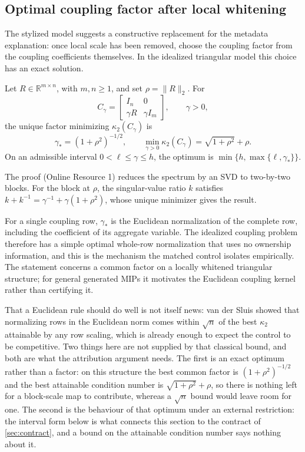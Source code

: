 \subsection{Optimal coupling factor after local whitening}

The stylized model suggests a constructive replacement for the metadata explanation: once
local scale has been removed, choose the coupling factor from the coupling coefficients
themselves. In the idealized triangular model this choice has an exact solution.

\begin{proposition}
\label{prop:audit-triangular-optimum}
Let $R\in\mathbb R^{m\times n}$, with $m,n\geq1$, and set $\rho=\|R\|_2$. For
\[
 C_\gamma=\begin{bmatrix}I_n&0\\\gamma R&\gamma I_m\end{bmatrix},
 \qquad\gamma>0,
\]
the unique factor minimizing $\kappa_2(C_\gamma)$ is
\[
 \gamma_*=(1+\rho^2)^{-1/2},
 \qquad
 \min_{\gamma>0}\kappa_2(C_\gamma)=\sqrt{1+\rho^2}+\rho.
\]
On an admissible interval $0<\ell\leq\gamma\leq h$, the optimum is
$\min\{h,\max\{\ell,\gamma_*\}\}$.
\end{proposition}
The proof (Online Resource 1) reduces the spectrum by an SVD to two-by-two blocks. For the
block at $\rho$, the singular-value ratio $k$ satisfies
$k+k^{-1}=\gamma^{-1}+\gamma(1+\rho^2)$, whose unique minimizer gives the result.

For a single coupling row, $\gamma_*$ is the Euclidean normalization of the complete row,
including the coefficient of its aggregate variable. The idealized coupling problem
therefore has a simple optimal whole-row normalization that uses no ownership information,
and this is the mechanism the matched control isolates empirically. The statement concerns a
common factor on a locally whitened triangular structure; for general generated MIPs it
motivates the Euclidean coupling kernel rather than certifying it.

That a Euclidean rule should do well is not itself news: van der Sluis
\cite{vandersluis1969condition} showed that normalizing rows in the Euclidean norm comes
within $\sqrt n$ of the best $\kappa_2$ attainable by any row scaling, which is already
enough to expect the control to be competitive. Two things here are not supplied by that
classical bound, and both are what the attribution argument needs. The first is an exact
optimum rather than a factor: on this structure the best common factor is $(1+\rho^2)^{-1/2}$
and the best attainable condition number is $\sqrt{1+\rho^2}+\rho$, so there is nothing left
for a block-scale map to contribute, whereas a $\sqrt n$ bound would leave room for one. The
second is the behaviour of that optimum under an external restriction: the interval form
below is what connects this section to the contract of \cref{sec:contract}, and a bound on
the attainable condition number says nothing about it.

